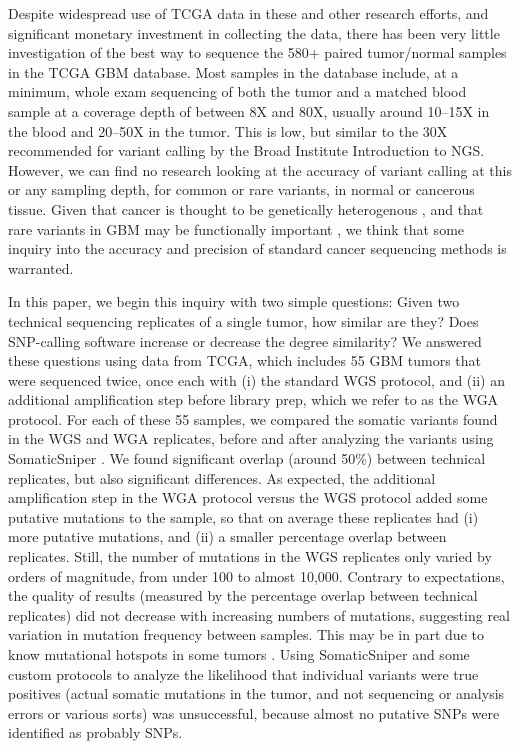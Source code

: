 \documentclass[11pt]{article} %
\begin{document}
Despite widespread use of TCGA data in these and other research efforts, and significant monetary investment in collecting the data, there has been very little investigation of the best way to sequence the 580+ paired tumor/normal samples in the TCGA GBM database. Most samples in the database include, at a minimum, whole exam sequencing of both the tumor and a matched blood sample at a coverage depth of between 8X and 80X, usually around 10--15X in the blood and 20--50X in the tumor. This is low, but similar to the 30X recommended for variant calling by the Broad Institute Introduction to NGS. However, we can find no research looking at the accuracy of variant calling at this or any sampling depth, for common or rare variants, in normal or cancerous tissue. Given that cancer is thought to be genetically heterogenous \cite{heterogenous1, heterogenous2}, and that rare variants in GBM may be functionally important \cite{rare}, we think that some inquiry into the accuracy and precision of standard cancer sequencing methods is warranted. 

In this paper, we begin this inquiry with two simple questions: Given two technical sequencing replicates of a single tumor, how similar are they? Does SNP-calling software increase or decrease the degree similarity? We answered these questions using data from TCGA, which includes 55 GBM tumors that were sequenced twice, once each with (i) the standard WGS protocol, and (ii) an additional amplification step before library prep, which we refer to as the WGA protocol. For each of these 55 samples, we compared the somatic variants found in the WGS and WGA replicates, before and after analyzing the variants using SomaticSniper \cite{SomaticSniper}. We found significant overlap (around 50\%) between technical replicates, but also significant differences. As expected, the additional amplification step in the WGA protocol versus the WGS protocol added some putative mutations to the sample, so that on average these replicates had (i) more putative mutations, and (ii) a smaller percentage overlap between replicates. Still, the number of mutations in the WGS replicates only varied by orders of magnitude, from under 100 to almost 10,000. Contrary to expectations, the quality of results (measured by the percentage overlap between technical replicates) did not decrease with increasing numbers of mutations, suggesting real variation in mutation frequency between samples. This may be in part due to know mutational hotspots in some tumors \cite{Karen}. Using SomaticSniper and some custom protocols to analyze the likelihood that individual variants were true positives (actual somatic mutations in the tumor, and not sequencing or analysis errors or various sorts) was unsuccessful, because almost no putative SNPs were identified as probably SNPs.
\end{document}
